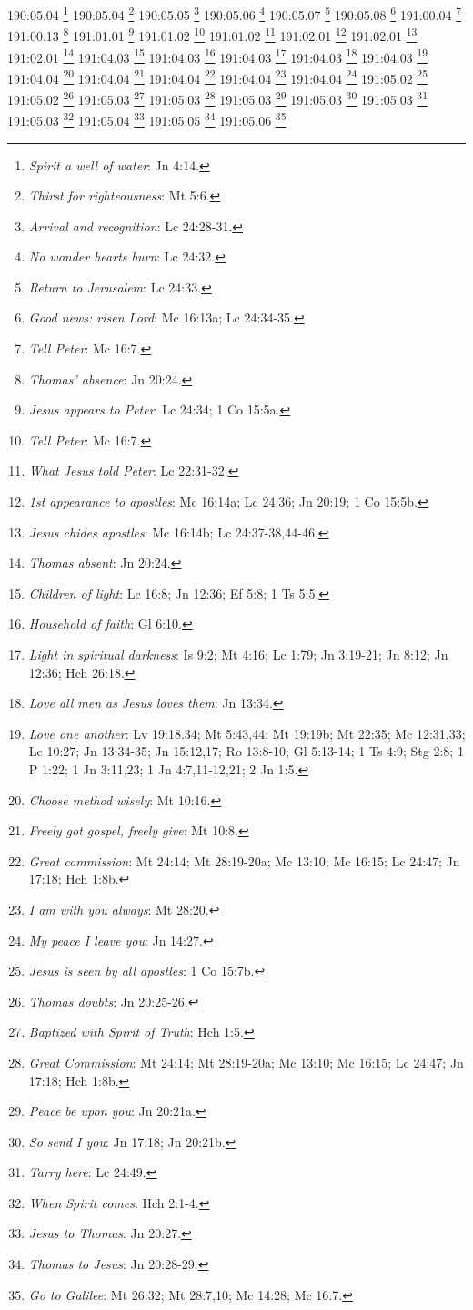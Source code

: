 190:05.04 \footnote{\textit{Spirit a well of water}: Jn 4:14.}
190:05.04 \footnote{\textit{Thirst for righteousness}: Mt 5:6.}
190:05.05 \footnote{\textit{Arrival and recognition}: Lc 24:28-31.}
190:05.06 \footnote{\textit{No wonder hearts burn}: Lc 24:32.}
190:05.07 \footnote{\textit{Return to Jerusalem}: Lc 24:33.}
190:05.08 \footnote{\textit{Good news: risen Lord}: Mc 16:13a; Lc 24:34-35.}
191:00.04 \footnote{\textit{Tell Peter}: Mc 16:7.}
191:00.13 \footnote{\textit{Thomas' absence}: Jn 20:24.}
191:01.01 \footnote{\textit{Jesus appears to Peter}: Lc 24:34; 1 Co 15:5a.}
191:01.02 \footnote{\textit{Tell Peter}: Mc 16:7.}
191:01.02 \footnote{\textit{What Jesus told Peter}: Lc 22:31-32.}
191:02.01 \footnote{\textit{1st appearance to apostles}: Mc 16:14a; Lc 24:36; Jn 20:19; 1 Co 15:5b.}
191:02.01 \footnote{\textit{Jesus chides apostles}: Mc 16:14b; Lc 24:37-38,44-46.}
191:02.01 \footnote{\textit{Thomas absent}: Jn 20:24.}
191:04.03 \footnote{\textit{Children of light}: Lc 16:8; Jn 12:36; Ef 5:8; 1 Ts 5:5.}
191:04.03 \footnote{\textit{Household of faith}: Gl 6:10.}
191:04.03 \footnote{\textit{Light in spiritual darkness}: Is 9:2; Mt 4:16; Lc 1:79; Jn 3:19-21; Jn 8:12; Jn 12:36; Hch 26:18.}
191:04.03 \footnote{\textit{Love all men as Jesus loves them}: Jn 13:34.}
191:04.03 \footnote{\textit{Love one another}: Lv 19:18.34; Mt 5:43,44; Mt 19:19b; Mt 22:35; Mc 12:31,33; Lc 10:27; Jn 13:34-35; Jn 15:12,17; Ro 13:8-10; Gl 5:13-14; 1 Ts 4:9; Stg 2:8; 1 P 1:22; 1 Jn 3:11,23; 1 Jn 4:7,11-12,21; 2 Jn 1:5.}
191:04.04 \footnote{\textit{Choose method wisely}: Mt 10:16.}
191:04.04 \footnote{\textit{Freely got gospel, freely give}: Mt 10:8.}
191:04.04 \footnote{\textit{Great commission}: Mt 24:14; Mt 28:19-20a; Mc 13:10; Mc 16:15; Lc 24:47; Jn 17:18; Hch 1:8b.}
191:04.04 \footnote{\textit{I am with you always}: Mt 28:20.}
191:04.04 \footnote{\textit{My peace I leave you}: Jn 14:27.}
191:05.02 \footnote{\textit{Jesus is seen by all apostles}: 1 Co 15:7b.}
191:05.02 \footnote{\textit{Thomas doubts}: Jn 20:25-26.}
191:05.03 \footnote{\textit{Baptized with Spirit of Truth}: Hch 1:5.}
191:05.03 \footnote{\textit{Great Commission}: Mt 24:14; Mt 28:19-20a; Mc 13:10; Mc 16:15; Lc 24:47; Jn 17:18; Hch 1:8b.}
191:05.03 \footnote{\textit{Peace be upon you}: Jn 20:21a.}
191:05.03 \footnote{\textit{So send I you}: Jn 17:18; Jn 20:21b.}
191:05.03 \footnote{\textit{Tarry here}: Lc 24:49.}
191:05.03 \footnote{\textit{When Spirit comes}: Hch 2:1-4.}
191:05.04 \footnote{\textit{Jesus to Thomas}: Jn 20:27.}
191:05.05 \footnote{\textit{Thomas to Jesus}: Jn 20:28-29.}
191:05.06 \footnote{\textit{Go to Galilee}: Mt 26:32; Mt 28:7,10; Mc 14:28; Mc 16:7.}
